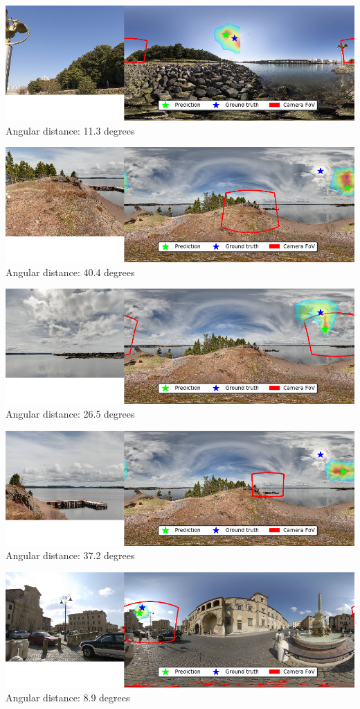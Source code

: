 \begin{multicols}{2}
\includegraphics[width=\mywidth]{pano_aakgxuckdrzzpz_002.jpg}\\
Angular distance: 11.3 degrees

\includegraphics[width=\mywidth]{pano_aakkizvmfscmlr.jpg}\\
Angular distance: 40.4 degrees

\includegraphics[width=\mywidth]{pano_aakkizvmfscmlr_005.jpg}\\
Angular distance: 26.5 degrees

\includegraphics[width=\mywidth]{pano_aakkizvmfscmlr_004.jpg}\\
Angular distance: 37.2 degrees

\includegraphics[width=\mywidth]{pano_aakpbaojeqowkb_006.jpg}\\
Angular distance: 8.9 degrees


\end{multicols}

